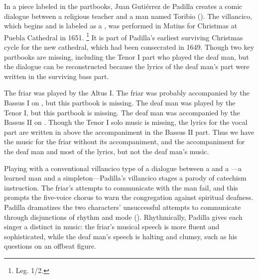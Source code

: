 In a piece labeled  in the partbooks, Juan Gutiérrez de Padilla creates a comic dialogue between a religious teacher and a  man named Toribio ().
The villancico, which begins  and is labeled as a , was performed in Matins for Christmas at Puebla Cathedral in 1651.%
\footnote{\signature{MEX-Pc}{Leg. 1/2}.}
It is part of Padilla's earliest surviving Christmas cycle for the new cathedral, which had been consecrated in 1649.
Though two key partbooks are missing, including the Tenor I part who played the deaf man, but the dialogue can be reconstructed because the lyrics of the deaf man's part were written in the surviving bass part.%
\begin{Footnote}
  The friar was played by the Altus I. 
  The friar was probably accompanied by the Bassus I on , but this partbook is missing.
  The deaf man was played by the Tenor I, but this partbook is missing.
  The deaf man was accompanied by the Bassus II on .
  Though the Tenor I solo music is missing, the lyrics for the vocal part are written in above the accompaniment in the Bassus II part. 
  Thus we have the music for the friar without its accompaniment, and the accompaniment for the deaf man and most of the lyrics, but not the deaf man's music.
\end{Footnote}


Playing with a conventional villancico type of a dialogue between a  and a ---a learned man and a simpleton---Padilla's villancico stages a parody of catechism instruction.
The friar's attempts to communicate with the  man fail, and this prompts the five-voice chorus to warn the congregation against spiritual deafness.
Padilla dramatizes the two characters' unsuccessful attempts to communicate through disjunctions of rhythm and mode ().
Rhythmically, Padilla gives each singer a distinct  in music: the friar's musical speech is more fluent and sophisticated, while the deaf man's speech is halting and clumsy, such as his questions  on an offbeat figure.

